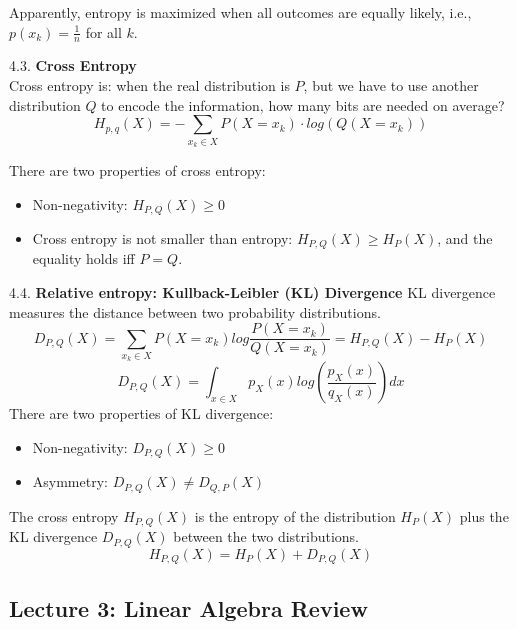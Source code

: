 \documentclass[
]{ctexart}
\providecommand{\tightlist}{%
  \setlength{\itemsep}{0pt}\setlength{\parskip}{0pt}}
\begin{document}
\begin{enumerate}
  Apparently, entropy is maximized when all outcomes are equally likely,
  i.e., \(p(x_k) = \frac{1}{n}\) for all \(k\).

  4.3. \textbf{Cross Entropy}\\
  Cross entropy is: when the real distribution is \(P\), but we have to
  use another distribution \(Q\) to encode the information, how many
  bits are needed on average?
  \[H_{p,q}(X) = -\sum_{x_k \in X} P(X = x_k) \cdot log (Q(X = x_k))\]

  There are two properties of cross entropy:

  \begin{itemize}
  \tightlist
  \item
    Non-negativity: \(H_{P,Q}(X) \geq 0\)
  \item
    Cross entropy is not smaller than entropy:
    \(H_{P,Q}(X) \geq H_P(X)\), and the equality holds iff \(P = Q\).
  \end{itemize}

  4.4. \textbf{Relative entropy: Kullback-Leibler (KL) Divergence} KL
  divergence measures the distance between two probability
  distributions.
  \[ D_{P,Q}(X) = \sum_{x_k \in X} P(X = x_k) log \frac{P(X = x_k)}{Q(X = x_k)} = H_{P,Q}(X) - H_P(X)\]
  \[ D_{P,Q}(X) = \int_{x \in X} p_X(x) log \left(\frac{p_X(x)}{q_X(x)}\right) dx \]
  There are two properties of KL divergence:

  \begin{itemize}
  \tightlist
  \item
    Non-negativity: \(D_{P,Q}(X) \geq 0\)
  \item
    Asymmetry: \(D_{P,Q}(X) \neq D_{Q,P}(X)\)
  \end{itemize}

  The cross entropy \(H_{P,Q}(X)\) is the entropy of the distribution
  \(H_P(X)\) plus the KL divergence \(D_{P,Q}(X)\) between the two
  distributions. \[H_{P,Q}(X) = H_P(X) + D_{P,Q}(X)\]
\end{enumerate}


\clearpage

\subsection{Lecture 3: Linear Algebra
Review}\label{lecture-3-linear-algebra-review}
\end{document}
